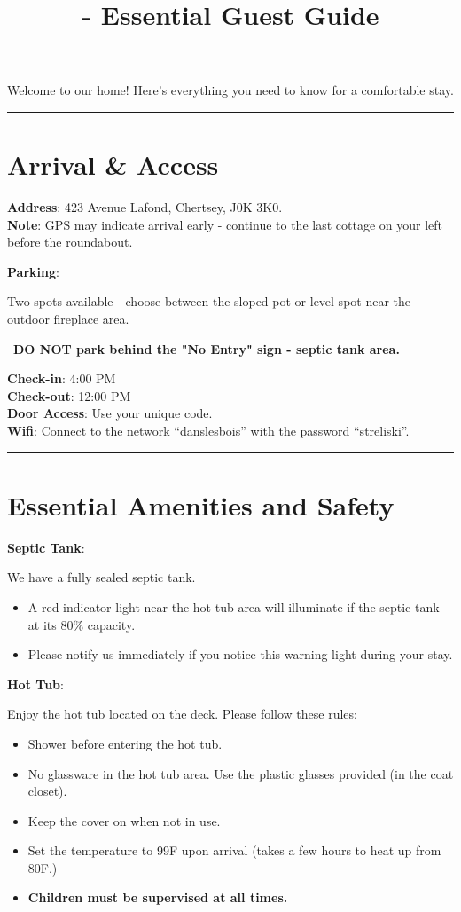 \documentclass{article}
\title{\chalet - Essential Guest Guide}
\newcommand*{\warnsign}{\begin{LARGE}\texttwemoji{warning}\end{LARGE}}
\newcommand{\separator}{\vspace{2em}\hrule}
\newcommand*{\subhead}[2]{\noindent\textbf{#1}: {#2}\vspace{1em}}
\newcommand*{\note}[1]{\textbf{Note}: {#1}}
\newcommand*{\warning}[1]{\warnsign \ \textbf{#1} \warnsign}
\begin{document}
\maketitle

Welcome to our home! Here's everything you need to know for a comfortable stay.

\separator
\section*{Arrival \& Access}

\subhead{Address} {
    423 Avenue Lafond, Chertsey, J0K 3K0.
    \\
    \note{GPS may indicate arrival early - continue to the last cottage on your left before the roundabout.}
}

\subhead{Parking} {
    Two spots available - choose between the sloped pot or level spot near the outdoor fireplace area.
    \\
    \warning{DO NOT park behind the "No Entry" sign - septic tank area.}
}

\subhead{Check-in} {4:00 PM}\\
\subhead{Check-out} {12:00 PM}\\
\subhead{Door Access} {Use your unique code.}\\
\subhead{Wifi} {Connect to the network ``danslesbois'' with the password ``streliski''.}

\separator
\section*{Essential Amenities and Safety}
\subhead{Septic Tank} { We have a fully sealed septic tank.
    \begin{itemize}
        \item A red indicator light near the hot tub area will illuminate if the septic tank at its 80\% capacity.
        \item Please notify us immediately if you notice this warning light during your stay.
    \end{itemize}
}

\subhead{Hot Tub} { Enjoy the hot tub located on the deck. Please follow these rules:
    \begin{itemize}
        \item Shower before entering the hot tub.
        \item No glassware in the hot tub area. Use the plastic glasses provided (in the coat closet).
        \item Keep the cover on when not in use.
        \item Set the temperature to 99\textdegree F upon arrival (takes a few hours to heat up from 80\textdegree F.)
        \item \textbf{Children must be supervised at all times.}
    \end{itemize}
}
\end{document}
